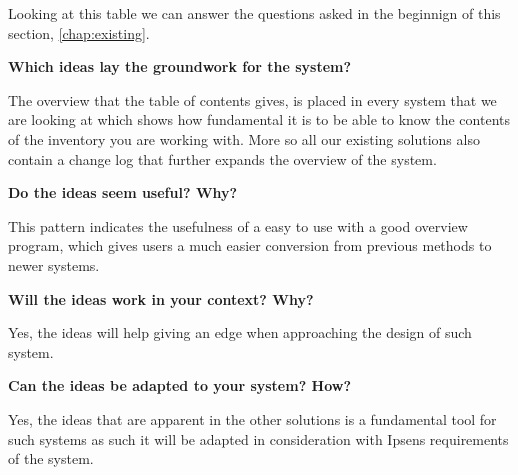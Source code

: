 Looking at this table we can answer the questions asked in the beginnign of this section, \cref{chap:existing}.

\textbf{Which ideas lay the groundwork for the system?}

The overview that the table of contents gives, is placed in every system that we are looking at which shows how fundamental it is to be able to know the contents of the inventory you are working with.
More so all our existing solutions also contain a change log that further expands the overview of the system.

\textbf{Do the ideas seem useful? Why?}

This pattern indicates the usefulness of a easy to use with a good overview program, which gives users a much easier conversion from previous methods to newer systems.

\textbf{Will the ideas work in your context? Why?}

Yes, the ideas will help giving an edge when approaching the design of such system.

\textbf{Can the ideas be adapted to your system? How?}

Yes, the ideas that are apparent in the other solutions is a fundamental tool for such systems as such it will be adapted in consideration with Ipsens requirements of the system.
